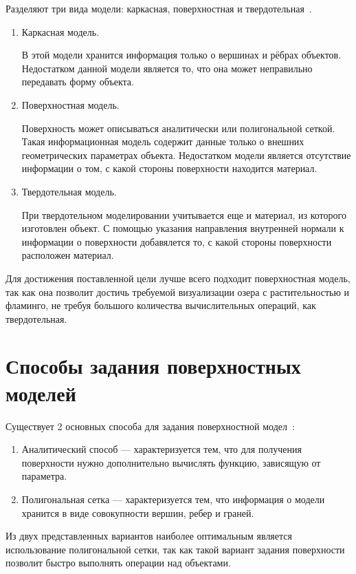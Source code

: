 Разделяют три вида модели: каркасная, поверхностная и твердотельная~\cite{kurov, roders, refl}.
\begin{enumerate}[label=\arabic*)]
	\item Каркасная модель. 
	
	В этой модели хранится информация только о вершинах и рёбрах объектов. Недостатком данной модели является то, что она может неправильно передавать форму объекта.
	\item Поверхностная модель.
	
	Поверхность может описываться аналитически или полигональной сеткой. Такая информационная модель содержит данные только о внешних геометрических параметрах объекта. Недостатком модели является отсутствие информации о том, с какой стороны поверхности находится материал.

	\item Твердотельная модель.
	
	При твердотельном моделировании учитывается еще и материал, из которого изготовлен объект.  С помощью указания направления внутренней нормали к информации о поверхности добавялется то, с какой стороны поверхности расположен материал.
\end{enumerate}

Для достижения поставленной цели лучше всего подходит поверхностная модель, так как она позволит достичь требуемой визуализации озера с растительностью и фламинго, не требуя большого количества вычислительных операций, как твердотельная. 

\section{Способы задания поверхностных моделей}

Существует 2 основных способа для задания поверхностной модел~\cite{roders}:
\begin{enumerate}[label=\arabic*)]
	\item Аналитический способ --- характеризуется тем, что для получения поверхности нужно дополнительно вычислять функцию, зависящую от параметра.
	
	\item Полигональная сетка --- характеризуется тем, что информация о модели хранится в виде совокупности вершин, ребер и граней.
\end{enumerate}

Из двух представленных вариантов наиболее оптимальным является использование полигональной сетки, так как такой вариант задания поверхности позволит быстро выполнять операции над объектами.


